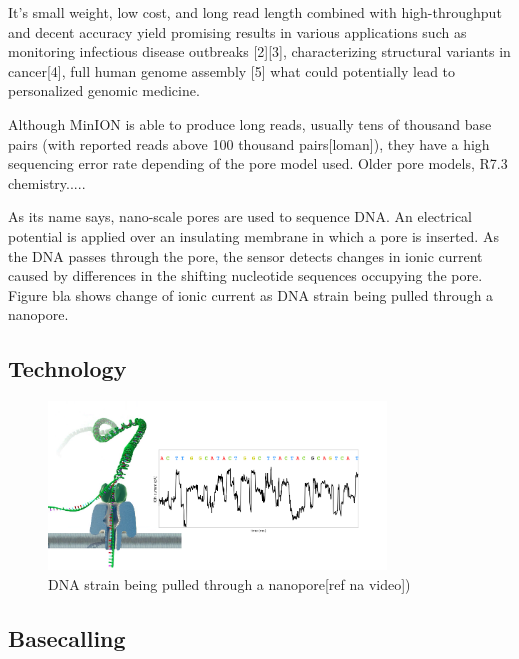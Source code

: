\documentclass[times, utf8, diplomski, numeric, english]{fer}
\begin{document}
It’s small weight, low cost, and long read length combined with high-throughput and decent accuracy yield promising results in various applications such as monitoring infectious disease outbreaks [2][3], characterizing structural variants in cancer[4], full human genome assembly [5] what could potentially lead to personalized genomic medicine.

Although MinION is able to produce long reads, usually tens of thousand
base pairs (with reported reads above 100 thousand pairs[loman]), they have a high sequencing error
rate depending of the pore model used. Older pore models, R7.3 chemistry.....%



As its name says, nano-scale pores are used to sequence DNA. An electrical potential is applied over an insulating membrane in which a  pore is inserted. As the DNA passes through the pore, the sensor detects changes in ionic current caused by differences in the shifting nucleotide sequences occupying the pore. Figure bla shows change of ionic current as DNA strain being pulled through a nanopore.



\subsection{Technology}
\begin{figure}[!ht]
	\begin{center}
		\includegraphics[width=0.8\textwidth]{./imgs/nanopore.png}
		\caption{DNA strain being pulled through a nanopore[ref na video])}
		\label{fg:nanopore}
	\end{center}
\end{figure}

\subsection{Basecalling}
\end{document}
